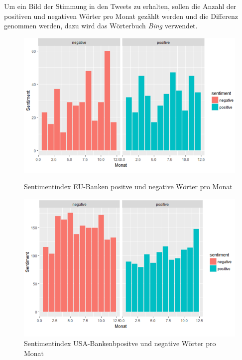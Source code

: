 Um ein Bild der Stimmung in den Tweets zu erhalten, sollen die Anzahl der positiven und negativen Wörter pro Monat gezählt werden und die Differenz genommen werden, dazu wird das Wörterbuch \textit{Bing} verwendet.
\begin{figure}[H]
	\begin{minipage}[b]{.4\linewidth} %
		\includegraphics[width=1\textwidth]{Pictures/EUpostneg.png}
		\caption{Sentimentindex EU-Banken positve und negative Wörter pro Monat} \label{eusent}
	\end{minipage}
	\hspace{.1\linewidth}%
	\begin{minipage}[b]{.4\linewidth} %
		\includegraphics[width=1\textwidth]{Pictures/USApostneg.png}
		\caption{Sentimentindex USA-Bankenbpositve und negative Wörter pro Monat}\label{usasent}
	\end{minipage}


\end{figure}
